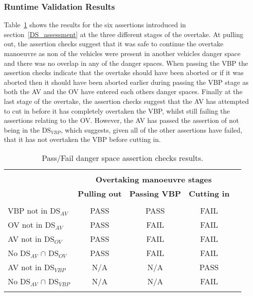 \subsubsection{Runtime Validation Results}
Table~\ref{Overtaking_DS_table} shows the results for the six assertions introduced in section~\ref{DS_assessment} at the three different stages of the overtake. At pulling out, the assertion checks suggest that it was safe to continue the overtake manoeuvre as non of the vehicles were present in another vehicles danger space and there was no overlap in any of the danger spaces. 
When passing the VBP the assertion checks indicate that the overtake should have been aborted or if it was aborted then it should have been aborted earlier during passing the VBP stage as both the AV and the OV have entered each others danger spaces. Finally at the last stage of the overtake, the assertion checks suggest that the AV has attempted to cut in before it has completely overtaken the VBP, whilst still failing the assertions relating to the OV. However, the AV has passed the assertion of not being in the DS$_{VBP}$, which suggests, given all of the other assertions have failed, that it has not overtaken the VBP before cutting in.

\begin{table}
\centering
\begin{tabular}{ lcccc }
\hline
\\
\multirow{3}{*}{\textbf{}} & \multicolumn{3}{c}{\textbf{Overtaking manoeuvre stages}}\\
\textbf{Assertion} & \textbf{Pulling out} & \textbf{Passing VBP} & \textbf{Cutting in} & \\
&  &  &  & \\
VBP not in DS$_{AV}$ & PASS & PASS & FAIL\\
%
OV not in DS$_{AV}$ & PASS & FAIL & FAIL\\
%
AV not in DS$_{OV}$  & PASS & FAIL & FAIL\\
%
No DS$_{AV}$ $\cap$ DS$_{OV}$  & PASS & FAIL & FAIL\\
%
AV not in DS$_{VBP}$  & N/A & N/A & PASS\\
%
No DS$_{AV}$ $\cap$ DS$_{VBP}$  & N/A & N/A & FAIL\\
%
\\
\hline
\end{tabular}
\caption{Pass/Fail danger space assertion checks results.} \label{Overtaking_DS_table}
\end{table}




